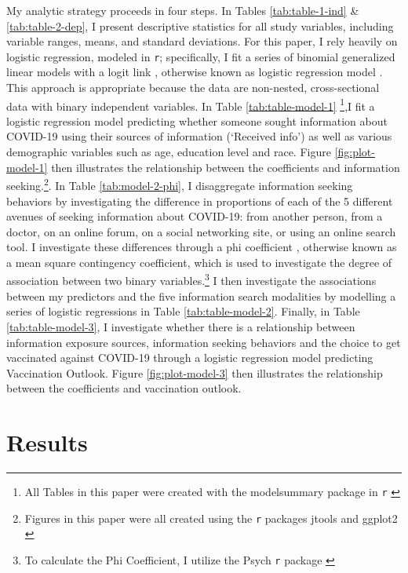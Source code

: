 My analytic strategy proceeds in four steps. In Tables \ref{tab:table-1-ind}
\& \ref{tab:table-2-dep}, I present descriptive statistics for all study
variables, including variable ranges, means, and standard deviations. For this
paper, I rely heavily on logistic regression, modeled in \texttt{r}; specifically, I
fit a series of binomial generalized linear models with a logit link \citep{venables2002a},
otherwise known as logistic regression model \citep{hothorn2006handbook}.
This approach is appropriate because the data
are non-nested, cross-sectional data with binary independent variables. In Table \ref{tab:table-model-1}
\footnote{All Tables in this paper were created with the modelsummary package in \texttt{r} 
\citep{modelsummary}},I fit a logistic regression model predicting
whether someone sought information about COVID-19 using their sources of
information (`Received info') as well as various demographic variables such as
age, education level and race. Figure \ref{fig:plot-model-1} then illustrates
the relationship between the coefficients and information seeking.\footnote{Figures 
in this paper were all created using the \texttt{r} packages jtools \citep{jtools}
and ggplot2 \citep{wickham_etal, wickham11}}.
In Table \ref{tab:model-2-phi}, I disaggregate information seeking behaviors by
investigating the difference in proportions of each of the 5 different avenues
of seeking information about COVID-19: from another person, from a doctor, on an
online forum, on a social networking site, or using an online search tool. I
investigate these differences through a phi coefficient \citep{warrens08}, otherwise
known as a mean square contingency coefficient, which is used to investigate the
degree of association between two binary variables.\footnote{To calculate the Phi
  Coefficient, I utilize the Psych \texttt{r} package \citep{psych}} I then investigate the
associations between my predictors and the five information search modalities by
modelling a series of logistic regressions in Table \ref{tab:table-model-2}.
Finally, in Table \ref{tab:table-model-3}, I investigate whether there is a
relationship between information exposure sources, information seeking behaviors and
the choice to get vaccinated against COVID-19 through a logistic regression
model predicting Vaccination Outlook. Figure \ref{fig:plot-model-3} then
illustrates the relationship between the coefficients and vaccination outlook.

\hypertarget{results}{%
\section{Results}\label{results}}

